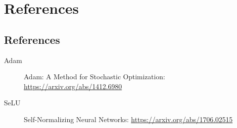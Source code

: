 \part{References}

\chapter{References}

\begin{description}
	\item[Adam] Adam: A Method for Stochastic Optimization: \url{https://arxiv.org/abs/1412.6980} \label{adam}
	\item[SeLU] Self-Normalizing Neural Networks: \url{https://arxiv.org/abs/1706.02515} \label{selu}
\end{description}



